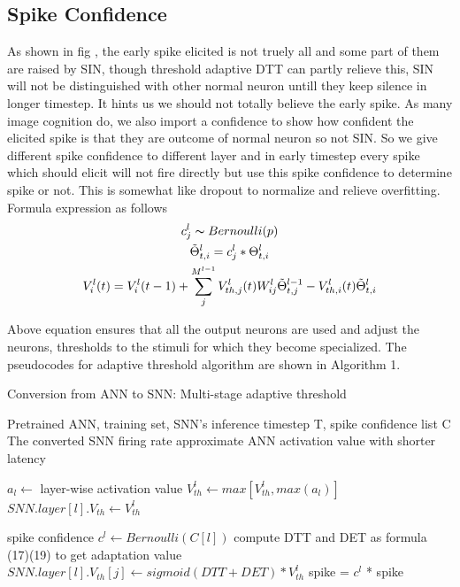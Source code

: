 \documentclass{article}
\begin{document}
\subsection{Spike Confidence}
As shown in fig , the early spike elicited is not truely all and some part of them are raised by SIN, though threshold adaptive DTT can partly relieve this, SIN will not be distinguished with other
normal neuron untill they keep silence in longer timestep. It hints us we should not totally believe the early spike.
As many image cognition do, we also import a confidence to show how confident the elicited spike is that they are outcome of normal neuron so not SIN.
So we give different spike confidence to different layer and in early timestep every spike which should elicit will not fire directly but use this spike confidence to determine spike or not.
This is somewhat like dropout\cite{srivastava2014dropout} to normalize and relieve overfitting. Formula expression as follows
\begin{gather}
  c_j^l \thicksim Bernoulli(p) \notag \\
  \tilde{\Theta}_{t,i}^l = c_j^l * \Theta_{t,i}^l \notag \\
  V_i^l(t)=V_{i}^{l}(t-1)+\sum_j^{M^{l-1}}V_{th,j}^l(t)W_{ij}^l\tilde{\Theta}_{t,j}^{l-1} -V_{th,i}^l(t)\tilde{\Theta}_{t,i}^{l}
\end{gather}

Above equation ensures that all the output neurons are used and adjust the neurons, thresholds to the
stimuli for which they become specialized.
The pseudocodes for adaptive threshold algorithm are shown in Algorithm 1.
\begin{algorithm}[h] 
	\caption{Conversion from ANN to SNN: Multi-stage adaptive threshold} 
	\begin{algorithmic}[1] 
		\Require 
    Pretrained ANN, training set,  SNN's inference timestep T, spike confidence list C
		\Ensure 
		The converted SNN firing rate approximate ANN activation value with shorter latency

      \State $a_l \gets$ layer-wise activation value
        \State $V_{th}^l \gets max[V_{th}^l, max(a_l)]$
        \State $SNN.layer[l].V_{th} \gets V_{th}^l$
      \EndFor
    \EndFor

        \State spike confidence $c^l \gets Bernoulli(C[l])$
          \State compute DTT and DET as formula (17)(19) to get adaptation value
          \State $SNN.layer[l].V_{th}[j] \gets sigmoid(DTT+DET) * V_{th}^l$
          \State spike = $c^l$ * spike
          \EndIf
        \EndFor
      \EndFor
    \EndFor

	\end{algorithmic} 
\end{algorithm}
\end{document}

